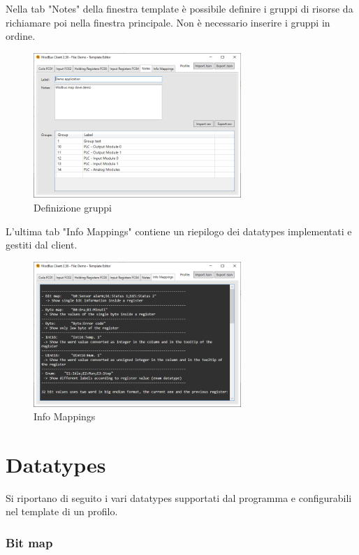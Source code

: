 Nella tab "Notes" della finestra template è possibile definire i gruppi di risorse
da richiamare poi nella finestra principale. Non è necessario inserire i gruppi in ordine.

\begin{figure}[H]
\centering
\includegraphics[width=0.70\textwidth]{../Img/ModBus_Client_Template_Group_Definition.PNG}
\caption{Definizione gruppi}
\end{figure}

L'ultima tab "Info Mappings" contiene un riepilogo dei datatypes implementati e gestiti dal client.

\begin{figure}[H]
\centering
\includegraphics[width=0.70\textwidth]{../Img/ModBus_Client_Template_Info_Mappings.PNG}
\caption{Info Mappings}
\end{figure}

\newpage
\section{Datatypes}

Si riportano di seguito i vari datatypes supportati dal programma e configurabili nel template di un profilo.

\subsubsection{Bit map}


